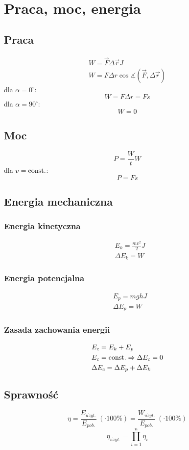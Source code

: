 \chapter{Praca, moc, energia}
  \section{Praca}
    \begin{gather}
      W = \vec F\Delta\vec r \unit{J}\\
      W = F\Delta r \cos\measuredangle(\vec F, \Delta\vec r)
    \end{gather}
    dla $\alpha = 0^\circ$:
    \begin{equation}
      W = F\Delta r = Fs
    \end{equation}
    dla $\alpha = 90^\circ$:
    \begin{equation}
      W = 0
    \end{equation}
  \section{Moc}
    \begin{equation}
      P = \frac{W}{t} \unit{W}
    \end{equation}
    dla $v = \operatorname{const.}$:
    \begin{equation}
      P = Fs
    \end{equation}
  \section{Energia mechaniczna}
    \subsection{Energia kinetyczna}
      \begin{align}
        &E_k = \frac{mv^2}{2} \unit{J}\\
        &\Delta E_k = W
      \end{align}
    \subsection{Energia potencjalna}
      \begin{align}
        &E_p = mgh \unit{J}\\
        &\Delta E_p = W
      \end{align}
    \subsection{Zasada zachowania energii}
      \begin{align}
        &E_c = E_k + E_p\\
        &E_c = \operatorname{const.} \Rightarrow \Delta E_c = 0\\
        &\Delta E_c = \Delta E_p + \Delta E_k
      \end{align}
  \section{Sprawność}
    \begin{equation}
      \eta = \frac{E_{u\dot{z}yt.}}{E_{pob.}}\: (\cdot 100\%) = \frac{W_{u\dot{z}yt.}}{E_{pob.}}\: (\cdot 100\%)
    \end{equation}
    \begin{equation}
      \eta_{u\dot{z}yt.} = \prod_{i=1}^n \eta_i
    \end{equation}
